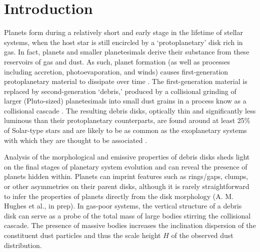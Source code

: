 \documentclass[12pt,oneside]{article}
\begin{document}
% 
% 
% 
% 

\section{Introduction}
\label{section: introduction}

Planets form during a relatively short and early stage in the lifetime of stellar systems,  when the host star is still encircled by a `protoplanetary' disk rich in gas. 
In fact, planets and smaller planetesimals derive their substance from these reservoirs of gas and dust.
As such, planet formation (as well as processes including accretion, photoevaporation, and winds) causes first-generation protoplanetary material to dissipate over time \citep{williams&cieza11,ercolano&pascucci17}.
The first-generation material is replaced by second-generation `debris,' produced by a collisional grinding of larger (Pluto-sized) planetesimals into small dust grains in a process know as a collisional cascade \citep{wyatt2008}. 
The resulting debris disks, optically thin and significantly less luminous than their protoplanetary counterparts, are found around at least 25\% of Solar-type stars and are likely to be as common as the exoplanetary systems with which they are thought to be associated \citep{montesinos16}.

Analysis of the morphological and emissive properties of debris disks sheds light on the final stages of planetary system evolution and can reveal the presence of planets hidden within.
Planets can imprint features such as rings/gaps, clumps, or other asymmetries on their parent disks, although it is rarely straightforward to infer the properties of planets directly from the disk morphology (A. M. Hughes et al., in prep).
In gas-poor systems, the vertical structure of a debris disk can serve as a probe of the total mass of large bodies stirring the collisional cascade.
The presence of massive bodies increases the inclination dispersion  of the constituent dust particles and thus the scale height $H$ of the observed dust distribution.
\end{document}
